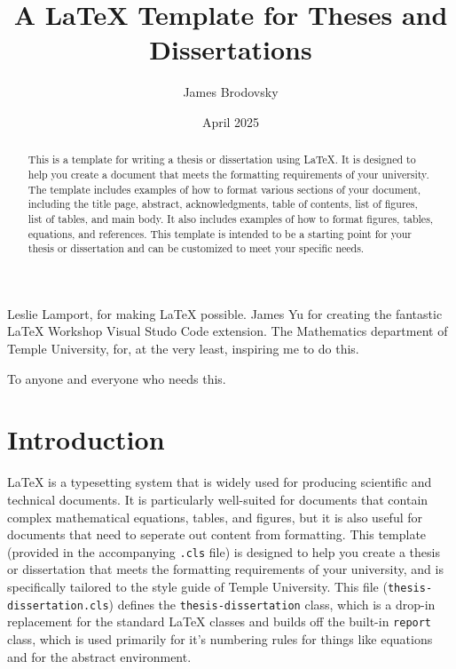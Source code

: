 \documentclass{thesis-dissertation}
\title{A \LaTeX{} Template for Theses and Dissertations}
\author{James Brodovsky}        %
\date{April 2025}               %
\begin{document}
\newtheorem{notation}{Notation}[chapter]
\newtheorem{rem}{Remark}[chapter]
\newtheorem{lem}{Lemma}[chapter]
\newtheorem{cor}{Corollary}[chapter]
\newtheorem{tem}{Theorem}[chapter]
\newtheorem{prop}{Proposition}[chapter]
\newtheorem{example}{Example}[chapter]
\newtheorem{define}{Definition}[chapter]

\maketitlepage{}

\begin{abstract}
  This is a template for writing a thesis or dissertation using \LaTeX{}. It is designed to help you create a document that meets the formatting requirements of your university. The template includes examples of how to format various sections of your document, including the title page, abstract, acknowledgments, table of contents, list of figures, list of tables, and main body. It also includes examples of how to format figures, tables, equations, and references. This template is intended to be a starting point for your thesis or dissertation and can be customized to meet your specific needs.
\end{abstract}

\begin{acknowledgments}
  Leslie Lamport, for making \LaTeX{} possible. James Yu for creating the fantastic LaTeX Workshop Visual Studo Code extension. The Mathematics department of Temple University, for, at the very least, inspiring me to do this.
\end{acknowledgments}

\begin{dedication}
  To anyone and everyone who needs this.
\end{dedication}

\singlespacing{}
\tableofcontents{}
\listoffigures{}
\listoftables{}

\newpage{}
\doublespacing{}

\chapter{Introduction}
\LaTeX{} is a typesetting system that is widely used for producing scientific and technical documents. It is particularly well-suited for documents that contain complex mathematical equations, tables, and figures, but it is also useful for documents that need to seperate out content from formatting. This template (provided in the accompanying \texttt{.cls} file) is designed to help you create a thesis or dissertation that meets the formatting requirements of your university, and is specifically tailored to the style guide of Temple University. This file (\texttt{thesis-dissertation.cls}) defines the \texttt{thesis-dissertation} class, which is a drop-in replacement for the standard \LaTeX{} classes and builds off the built-in \texttt{report} class, which is used primarily for it's numbering rules for things like equations and for the abstract environment.
\end{document}
